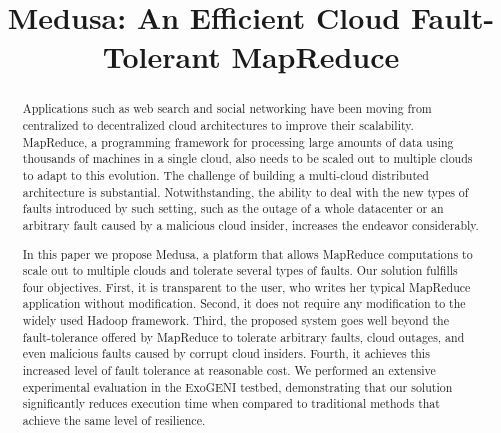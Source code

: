 \documentclass[10pt, conference, compsocconf]{IEEEtran}
\begin{document}
\title{Medusa: An Efficient Cloud Fault-Tolerant MapReduce}

\author{
}

\maketitle
\begin{abstract}
Applications such as web search and social networking have been moving from centralized to decentralized cloud architectures to improve their scalability.
MapReduce, a programming framework for processing large amounts of data using thousands of machines in a single cloud, also needs to be scaled out to multiple clouds to adapt to this evolution.
The challenge of building a multi-cloud distributed architecture is substantial.
Notwithstanding, the ability to deal with the new types of faults introduced by such setting, such as the outage of a whole datacenter or an arbitrary fault caused by a malicious cloud insider, increases the endeavor considerably.

In this paper we propose Medusa, a platform that allows MapReduce computations to scale out to multiple clouds and tolerate several types of faults.
Our solution fulfills four objectives.
First, it is transparent to the user, who writes her typical MapReduce application without modification.
Second, it does not require any modification to the widely used Hadoop framework.
Third, the proposed system goes well beyond the fault-tolerance offered by MapReduce to tolerate arbitrary faults, cloud outages, and even malicious faults caused by corrupt cloud insiders.
Fourth, it achieves this increased level of fault tolerance at reasonable cost.
We performed an extensive experimental evaluation in the ExoGENI testbed, demonstrating that our solution significantly reduces execution time when compared to traditional methods that achieve the same level of resilience.
\end{abstract}
\end{document}
